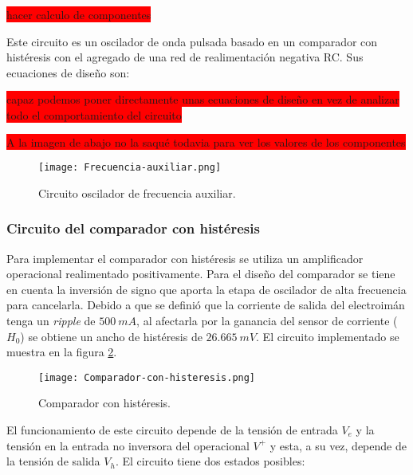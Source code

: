 \colorbox{red}{hacer calculo de componentes}

Este circuito es un oscilador de onda pulsada basado en un comparador con histéresis con el agregado de una red de realimentación negativa RC. Sus ecuaciones de diseño son:

\colorbox{red}{capaz podemos poner directamente unas ecuaciones de diseño en vez de analizar todo el comportamiento del circuito}

%



\colorbox{red}{A la imagen de abajo no la saqué todavia para ver los valores de los componentes}
\begin{figure}[H]
	\centering
	\texttt{[image: Frecuencia-auxiliar.png]}
	\caption{Circuito oscilador de frecuencia auxiliar.}
	\label{fig:img_frecuencia-auxiliarasdas}
\end{figure}

\subsubsection{Circuito del comparador con histéresis}

Para implementar el comparador con histéresis se utiliza un amplificador operacional realimentado positivamente. Para el diseño del comparador se tiene en cuenta la inversión de signo que aporta la etapa de oscilador de alta frecuencia para cancelarla. Debido a que se definió que la corriente de salida del electroimán tenga un \textsl{ripple} de $500\:mA$, al afectarla por la ganancia del sensor de corriente ($H_0$) se obtiene un ancho de histéresis de $26.665\:mV$. El circuito implementado se muestra en la figura \ref{fig:img_comp-con-hist}.

\begin{figure}[H]
	\centering
	\texttt{[image: Comparador-con-histeresis.png]}
	\caption{Comparador con histéresis.}
	\label{fig:img_comp-con-hist}
\end{figure}

El funcionamiento de este circuito depende de la tensión de entrada $V_e$ y la tensión en la entrada no inversora del operacional $V^+$ y esta, a su vez, depende de la tensión de salida $V_h$. El circuito tiene dos estados posibles:


